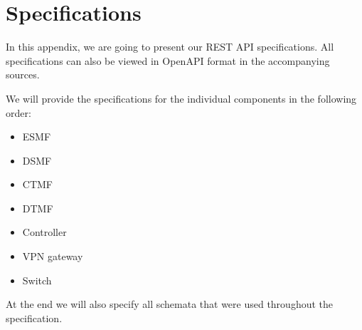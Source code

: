 \chapter{Specifications}
\label{specifications}

In this appendix, we are going to present our REST API specifications. All specifications can also be viewed in OpenAPI format in the accompanying sources.

We will provide the specifications for the individual components in the following order:

\begin{itemize}
    \item ESMF
    \item DSMF
    \item CTMF
    \item DTMF
    \item Controller
    \item VPN gateway
    \item Switch
\end{itemize}

At the end we will also specify all schemata that were used throughout the specification.

%
%
%
%
%
%
%